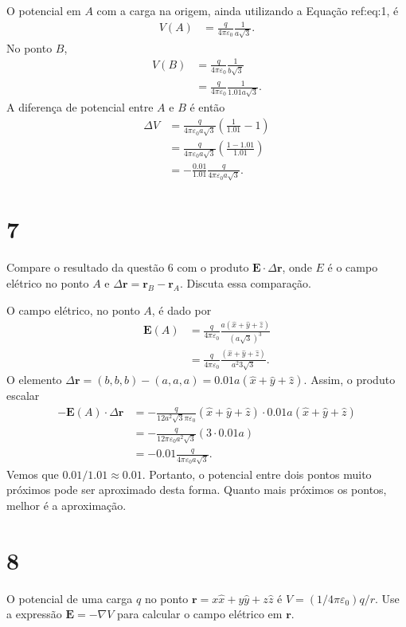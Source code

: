 \documentclass[11pt]{article}
\begin{document}
O potencial em \(A\) com a carga na origem, ainda utilizando a Equação
ref:eq:1, é
\begin{align}
  V(A) &= \frac q{4\pi\varepsilon_0} \frac1{a\sqrt3}.
\end{align}
No ponto \(B\),
\begin{align}
  V(B) &= \frac q{4\pi\varepsilon_0} \frac1{b\sqrt3}\\
       &= \frac q{4\pi\varepsilon_0} \frac1{1.01a\sqrt3}.
\end{align}
A diferença de potencial entre \(A\) e \(B\) é então
\begin{align}
  \Delta V &= \frac q{4\pi\varepsilon_0a\sqrt3} \left(\frac1{1.01}-1\right)\\
      &= \frac q{4\pi\varepsilon_0a\sqrt3} \left(\frac{1-1.01}{1.01}\right)\\
      &= -\frac{0.01}{1.01}\frac q{4\pi\varepsilon_0a\sqrt3}.
\end{align}
\section{7}
\label{sec:orgf1ee21e}
Compare o resultado da questão \(6\) com o produto \(\mathbf E\cdot\Delta\mathbf r\),
onde \(E\) é o campo elétrico no ponto \(A\) e \(\Delta\mathbf r=\mathbf
r_B-\mathbf r_A\). Discuta essa comparação.

O campo elétrico, no ponto \(A\), é dado por 
\begin{align}
  \mathbf E(A) &= \frac q{4\pi\varepsilon_0} \frac{a(\hat x+\hat y+\hat z)}{(a\sqrt3)^3}\\
               &= \frac q{4\pi\varepsilon_0} \frac{(\hat x+\hat y+\hat z)}{a^2 3\sqrt3}.
\end{align}
O elemento \(\Delta\mathbf r = (b,b,b)-(a,a,a) = 0.01a(\hat x+\hat y+\hat
z)\). Assim, o produto escalar
\begin{align}
  -\mathbf E(A)\cdot\Delta\mathbf r
  &= -\frac q{12a^2 \sqrt3\pi\varepsilon_0} (\hat x+\hat y+\hat z)\cdot
    0.01a(\hat x +\hat y+\hat z)\\
  &= -\frac q{12\pi\varepsilon_0a^2 \sqrt3} (3\cdot0.01a)\\
  &= -0.01 \frac q{4\pi\varepsilon_0a \sqrt3}.
\end{align}
Vemos que \(0.01/1.01 \approx 0.01\). Portanto, o potencial entre dois pontos
muito próximos pode ser aproximado desta forma. Quanto mais próximos os
pontos, melhor é a aproximação.
\section{8}
\label{sec:org9997e10}
O potencial de uma carga \(q\) no ponto \(\mathbf r=x\hat x+y\hat y+z\hat
z\) é \(V=(1/4\pi\varepsilon_0)q/r\). Use a expressão \(\mathbf E= -\nabla V\) para calcular o
campo elétrico em \(\mathbf r\).
\end{document}

